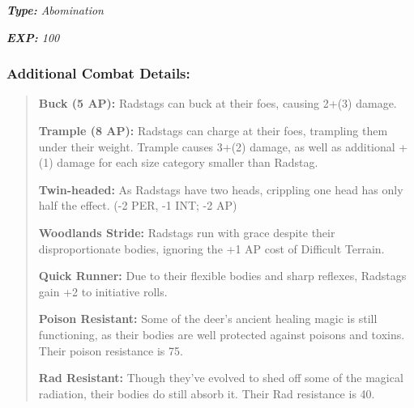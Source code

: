 \documentclass[11pt,a4paper,twocolumn]{book}
\begin{document}
	\emph{\textbf{Type:} Abomination}
	
	\emph{\textbf{EXP:} 100}
	
%		
%	
%		
	
	\subsubsection*{Additional Combat Details:}
	\begin{verse}
		\textbf{Buck (5 AP):} Radstags can buck at their foes, causing 2+(3) damage.
		
		\textbf{Trample (8 AP):} Radstags can charge at their foes, trampling them under their weight. Trample causes 3+(2) damage, as well as additional +(1) damage for each size category smaller than Radstag.
		
		\textbf{Twin-headed:} As Radstags have two heads, crippling one head has only half the effect. (-2 PER, -1 INT; -2 AP)
		
		\textbf{Woodlands Stride:} Radstags run with grace despite their disproportionate bodies, ignoring the +1 AP cost of Difficult Terrain.
		
		\textbf{Quick Runner:} Due to their flexible bodies and sharp reflexes, Radstags gain +2 to initiative rolls.
		
		\textbf{Poison Resistant:} Some of the deer's ancient healing magic is still functioning, as their bodies are well protected against poisons and toxins. Their poison resistance is 75.
		
		\textbf{Rad Resistant:} Though they've evolved to shed off some of the magical radiation, their bodies do still absorb it. Their Rad resistance is 40.
	\end{verse}
	
\end{document}
